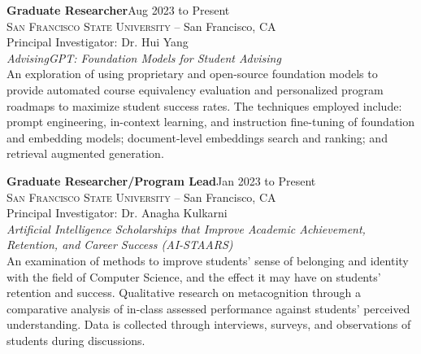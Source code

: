 \documentclass[hidelinks, 10.5pt]{article}
\def\contentwidth{0.9\linewidth}    %
\def\contentblockspacing{2.5mm}     %
\def\contentheaderspacing{1mm}      %
\begin{document}
{{    \begin{minipage}[ct]{\contentwidth}
        \textbf{Graduate Researcher}\hfill Aug 2023 to Present\\
        \textsc{San Francisco State University} -- San Francisco, CA\\
        Principal Investigator: Dr. Hui Yang
        \vspace{\contentheaderspacing}\\
        {\textit{AdvisingGPT: Foundation Models for Student Advising}}\\
        An exploration of using proprietary and open-source foundation models to provide automated course equivalency evaluation and
        personalized program roadmaps to maximize student success rates. The techniques employed include: prompt engineering, in-context
        learning, and instruction fine-tuning of foundation and embedding models; document-level embeddings search and ranking; and
        retrieval augmented generation.
    \end{minipage}

    \vspace{\contentblockspacing}

    \begin{minipage}[ct]{\contentwidth}
        \textbf{Graduate Researcher/Program Lead}\hfill Jan 2023 to Present\\
        \textsc{San Francisco State University} -- San Francisco, CA\\
        Principal Investigator: Dr. Anagha Kulkarni
        \vspace{\contentheaderspacing}\\
        {\textit{Artificial Intelligence Scholarships that Improve Academic Achievement, Retention, and Career Success (AI-STAARS)}}\\
        An examination of methods to improve students' sense of belonging and identity with the field of Computer Science,
        and the effect it may have on students' retention and success.  Qualitative research on metacognition through a comparative
        analysis of in-class assessed performance against students' perceived understanding.  Data is collected through interviews, surveys,
        and observations of students during discussions.
    \end{minipage}

}}
\end{document}
